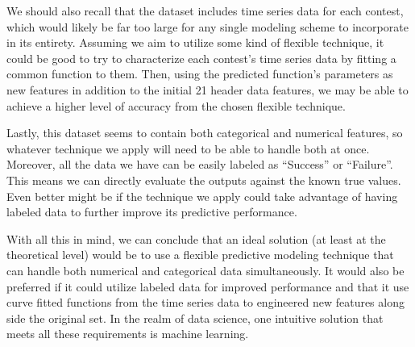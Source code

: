 We should also recall that the dataset includes time series data for each contest, which would likely be far too large for any single modeling scheme to incorporate in its entirety. Assuming we aim to utilize some kind of flexible technique, it could be good to try to characterize each contest's time series data by fitting a common function to them. Then, using the predicted function's parameters as new features in addition to the initial 21 header data features, we may be able to achieve a higher level of accuracy from the chosen flexible technique.

Lastly, this dataset seems to contain both categorical and numerical features, so whatever technique we apply will need to be able to handle both at once. Moreover, all the data we have can be easily labeled as ``Success'' or ``Failure''. This means we can directly evaluate the outputs against the known true values. Even better might be if the technique we apply could take advantage of having labeled data to further improve its predictive performance.

With all this in mind, we can conclude that an ideal solution (at least at the theoretical level) would be to use a flexible predictive modeling technique that can handle both numerical and categorical data simultaneously. It would also be preferred if it could utilize labeled data for improved performance and that it use curve fitted functions from the time series data to engineered new features along side the original set. In the realm of data science, one intuitive solution that meets all these requirements is machine learning. 





